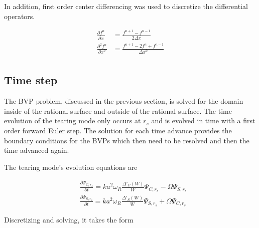 \documentclass{article}
\begin{document}
In addition, first order center differencing was used to discretize the differential operators.  

\begin{equation} \label{eq3}
\begin{split}
 \frac{\partial f^n}{\partial x} & = \frac{f^{n+1}-f^{n-1}}{2\Delta x} \\
 \frac{\partial^2 f^n}{\partial x^2} & = \frac{f^{n+1}-2f^n+f^{n-1}}{\Delta x^2} \\
\end{split} 
\end{equation} 


\subsection{Time step}

The BVP problem, discussed in the previous section, is solved for the domain inside of the rational surface and outside of the rational surface.  The time evolution of the tearing mode only occurs at $r_s$ and is evolved in time with a first order forward Euler step.  The solution for each time advance provides the boundary conditions for the BVPs which then need to be resolved and then the time advanced again.  

The tearing mode's evolution equations are

\begin{equation} \label{eq3}
\begin{split}
 & \frac{\partial \Psi_{C,r_s}}{\partial t} =k a^2 \omega_R \frac{\Delta'_C(W)}{W}\Psi_{C,r_s}-\Omega \Psi_{S,r_s} \\
  & \frac{\partial \Psi_{S,r_s}}{\partial t} =k a^2 \omega_R \frac{\Delta'_S(W)}{W}\Psi_{S,r_s}+\Omega \Psi_{C,r_s}
\end{split} 
\end{equation} 

Discretizing and solving, it takes the form
\end{document}
